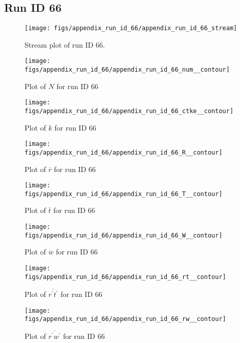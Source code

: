 \subsection{Run ID 66}
\begin{figure}[H]
\centering
\texttt{[image: figs/appendix\_run\_id\_66/appendix\_run\_id\_66\_stream]}
\caption{Stream plot of run ID 66.}
\label{fig:appendix_run_id_66_stream}
\end{figure}


\begin{figure}[H]
\centering
\texttt{[image: figs/appendix\_run\_id\_66/appendix\_run\_id\_66\_num\_\_contour]}
\caption{Plot of $N$ for run ID 66}
\label{fig:appendix_run_id_66_num__contour}
\end{figure}


\begin{figure}[H]
\centering
\texttt{[image: figs/appendix\_run\_id\_66/appendix\_run\_id\_66\_ctke\_\_contour]}
\caption{Plot of $k$ for run ID 66}
\label{fig:appendix_run_id_66_ctke__contour}
\end{figure}


\begin{figure}[H]
\centering
\texttt{[image: figs/appendix\_run\_id\_66/appendix\_run\_id\_66\_R\_\_contour]}
\caption{Plot of $\overline{r}$ for run ID 66}
\label{fig:appendix_run_id_66_R__contour}
\end{figure}


\begin{figure}[H]
\centering
\texttt{[image: figs/appendix\_run\_id\_66/appendix\_run\_id\_66\_T\_\_contour]}
\caption{Plot of $\overline{t}$ for run ID 66}
\label{fig:appendix_run_id_66_T__contour}
\end{figure}


\begin{figure}[H]
\centering
\texttt{[image: figs/appendix\_run\_id\_66/appendix\_run\_id\_66\_W\_\_contour]}
\caption{Plot of $\overline{w}$ for run ID 66}
\label{fig:appendix_run_id_66_W__contour}
\end{figure}


\begin{figure}[H]
\centering
\texttt{[image: figs/appendix\_run\_id\_66/appendix\_run\_id\_66\_rt\_\_contour]}
\caption{Plot of $\overline{r^\prime t^\prime}$ for run ID 66}
\label{fig:appendix_run_id_66_rt__contour}
\end{figure}


\begin{figure}[H]
\centering
\texttt{[image: figs/appendix\_run\_id\_66/appendix\_run\_id\_66\_rw\_\_contour]}
\caption{Plot of $\overline{r^\prime w^\prime}$ for run ID 66}
\label{fig:appendix_run_id_66_rw__contour}
\end{figure}


